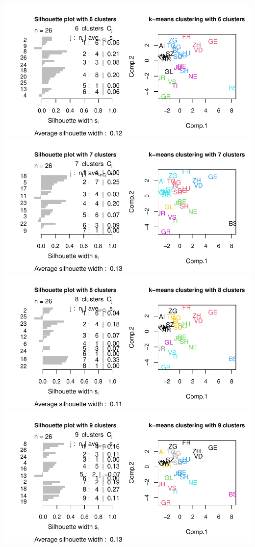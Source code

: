 \documentclass[
]{article}
\begin{document}
\includegraphics{Influence_factors_files/figure-latex/3.20_kmeans_cant-6.pdf}
\includegraphics{Influence_factors_files/figure-latex/3.20_kmeans_cant-7.pdf}
\includegraphics{Influence_factors_files/figure-latex/3.20_kmeans_cant-8.pdf}
\includegraphics{Influence_factors_files/figure-latex/3.20_kmeans_cant-9.pdf}
\end{document}
